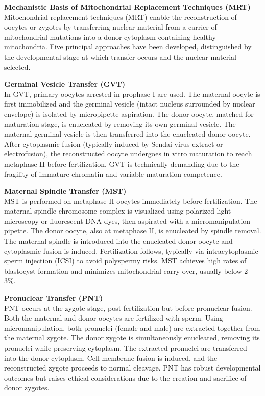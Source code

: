 \begin{technical}
{\Large\textbf{Mechanistic Basis of Mitochondrial Replacement Techniques (MRT)}}\\[0.7em]

Mitochondrial replacement techniques (MRT) enable the reconstruction of oocytes or zygotes by transferring nuclear material from a carrier of mitochondrial mutations into a donor cytoplasm containing healthy mitochondria. Five principal approaches have been developed, distinguished by the developmental stage at which transfer occurs and the nuclear material selected.

\vspace{0.4em}

\textbf{Germinal Vesicle Transfer (GVT)}\\
In GVT, primary oocytes arrested in prophase I are used. The maternal oocyte is first immobilized and the germinal vesicle (intact nucleus surrounded by nuclear envelope) is isolated by micropipette aspiration. The donor oocyte, matched for maturation stage, is enucleated by removing its own germinal vesicle. The maternal germinal vesicle is then transferred into the enucleated donor oocyte. After cytoplasmic fusion (typically induced by Sendai virus extract or electrofusion), the reconstructed oocyte undergoes in vitro maturation to reach metaphase II before fertilization. GVT is technically demanding due to the fragility of immature chromatin and variable maturation competence.

\vspace{0.4em}

\textbf{Maternal Spindle Transfer (MST)}\\
MST is performed on metaphase II oocytes immediately before fertilization. The maternal spindle-chromosome complex is visualized using polarized light microscopy or fluorescent DNA dyes, then aspirated with a micromanipulation pipette. The donor oocyte, also at metaphase II, is enucleated by spindle removal. The maternal spindle is introduced into the enucleated donor oocyte and cytoplasmic fusion is induced. Fertilization follows, typically via intracytoplasmic sperm injection (ICSI) to avoid polyspermy risks. MST achieves high rates of blastocyst formation and minimizes mitochondrial carry-over, usually below 2–3\%.

\vspace{0.4em}

\textbf{Pronuclear Transfer (PNT)}\\
PNT occurs at the zygote stage, post-fertilization but before pronuclear fusion. Both the maternal and donor oocytes are fertilized with sperm. Using micromanipulation, both pronuclei (female and male) are extracted together from the maternal zygote. The donor zygote is simultaneously enucleated, removing its pronuclei while preserving cytoplasm. The extracted pronuclei are transferred into the donor cytoplasm. Cell membrane fusion is induced, and the reconstructed zygote proceeds to normal cleavage. PNT has robust developmental outcomes but raises ethical considerations due to the creation and sacrifice of donor zygotes.


\end{technical}
